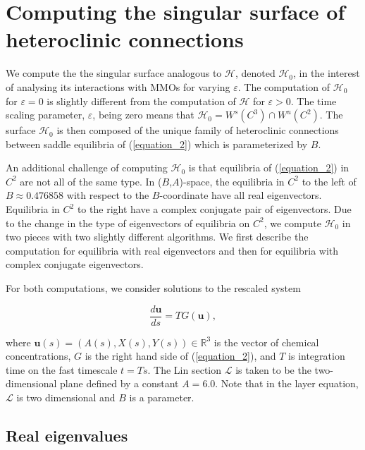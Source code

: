 \documentclass{ws-ijbc}
\begin{document}

\section{Computing the singular surface of heteroclinic connections}

We compute the the singular surface analogous to $\mathscr{H}$, denoted $\mathscr{H}_0$, in the interest of analysing its interactions with MMOs for varying $\varepsilon$.  The computation of $\mathscr{H}_0$ for $\varepsilon=0$ is slightly different from the computation of $\mathscr{H}$ for $\varepsilon > 0$.  The time scaling parameter, $\varepsilon$, being zero means that $\mathscr{H}_0 = W^s(C^3) \cap W^u(C^2)$.  The surface $\mathscr{H}_0$ is then composed of the unique family of heteroclinic connections between saddle equilibria of (\ref{equation_2}) which is parameterized by $B$.

An additional challenge of computing $\mathscr{H}_0$ is that equilibria of (\ref{equation_2}) in $C^2$ are not all of the same type.  In ($B$,$A$)-space, the equilibria in $C^2$ to the left of $B \approx 0.476858$ with respect to the $B$-coordinate have all real eigenvectors.  Equilibria in $C^2$ to the right have a complex conjugate pair of eigenvectors.  Due to the change in the type of eigenvectors of equilibria on $C^2$, we compute $\mathscr{H}_0$ in two pieces with two slightly different algorithms.  We first describe the computation for equilibria with real eigenvectors and then for equilibria with complex conjugate eigenvectors.  

For both computations, we consider solutions to the rescaled system

\begin{equation}
\frac{d\mathbf{u}}{ds} = TG(\mathbf{u}),
\label{fast_rescale}
\end{equation}

\noindent
where $\mathbf{u}(s) = (A(s), X(s), Y(s)) \in \mathbb{R}^3$ is the vector of chemical concentrations, $G$ is the right hand side of (\ref{equation_2}), and $T$ is integration time on the fast timescale $t=Ts$.  The Lin section $\mathscr{L}$ is taken to be the two-dimensional plane defined by a constant $A=6.0$.  Note that in the layer equation, $\mathscr{L}$ is two dimensional and $B$ is a parameter.

\subsection{Real eigenvalues}
\end{document}

